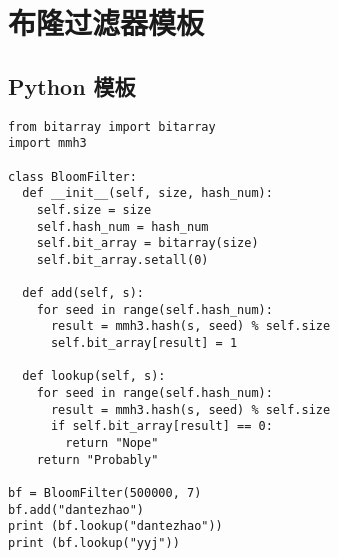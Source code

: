 \newpage
\section{布隆过滤器模板}

\subsection{Python 模板}

\begin{verbatim}
from bitarray import bitarray
import mmh3

class BloomFilter:
  def __init__(self, size, hash_num):
    self.size = size
    self.hash_num = hash_num
    self.bit_array = bitarray(size)
    self.bit_array.setall(0)

  def add(self, s):
    for seed in range(self.hash_num):
      result = mmh3.hash(s, seed) % self.size
      self.bit_array[result] = 1

  def lookup(self, s):
    for seed in range(self.hash_num):
      result = mmh3.hash(s, seed) % self.size
      if self.bit_array[result] == 0:
        return "Nope"
    return "Probably"

bf = BloomFilter(500000, 7)
bf.add("dantezhao")
print (bf.lookup("dantezhao"))
print (bf.lookup("yyj"))
\end{verbatim}

